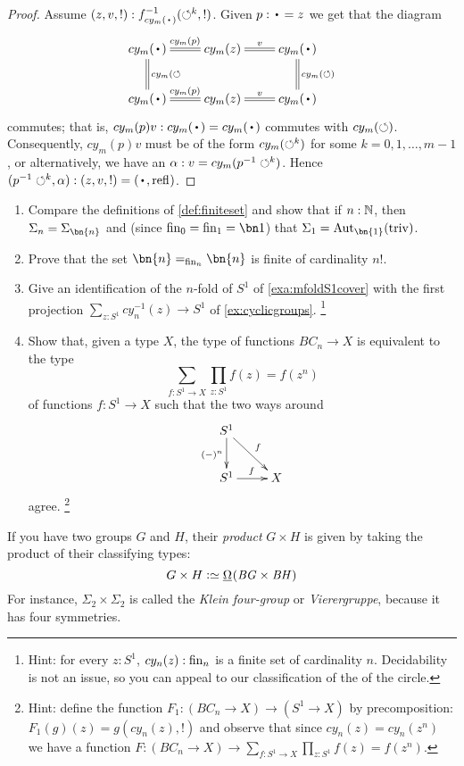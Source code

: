 \begin{example}
\begin{proof}
  Assume $(z,v,!):f_{cy_m(\base)}^{-1}(\Sloop^k,!)$.  Given $p:\base=z$ we get that the diagram
  $$\xymatrix{cy_m(\base)\ar@{=}[r]^{cy_m(p)}\ar@{=}[d]^{cy_m(\Sloop}&cy_m(z)\ar@{=}[r]^-v&cy_m(\base)\ar@{=}[d]^{cy_m(\Sloop)}\\
  cy_m(\base)\ar@{=}[r]^{cy_m(p)}&cy_m(z)\ar@{=}[r]^-v&cy_m(\base)}$$
commutes; that is, $cy_m(p)v:cy_m(\base)=cy_m(\base)$ commutes with $cy_m(\circlearrowleft)$.
Consequently, $cy_m(p)v$ must be of the form $cy_m(\circlearrowleft^k)$ for some $k=0,1,\dots,m-1$, or alternatively, we have an $\alpha:v=cy_m(p^{-1}\circlearrowleft^k)$.
Hence $(p^{-1}\Sloop^k,\alpha):(z,v,!)=(\base,\refl{})$.
\end{proof}

\end{example}
\begin{xca}
  \label{xca:somedetailsonfinitegroupstocheck}
  \begin{enumerate}
  \item Compare the definitions of \cref{def:finiteset} and show that if $n:\mathbb{N}$, then $\Sigma_n=\Sigma_{\bn{n} }$
and (since $\fin_0=\fin_1=\bn 1$) that $\Sigma_{1}=\aut_{\bn{1} }(\triv)$.
\item Prove that the set $\bn{n} =_{\fin_n}\bn{n} $ is finite of cardinality $n!$.
\item Give an identification of the $n$-fold \covering of $S^1$ of \cref{exa:mfoldS1cover} with the first projection $\sum_{z:S^1}cy_n^{-1}(z)\to S^1$ of \cref{ex:cyclicgroups}.
\footnote{Hint: for every $z:S^1$, $cy_n(z):\fin_n$ is a finite set of cardinality $n$.
Decidability is not an issue, so you can appeal to our classification of the \coverings of the circle.}
\item Show that, given a type $X$, the type of functions $BC_n\to X$ is equivalent to the type
$$\sum_{f:S^1\to X}\prod_{z:S^1}f(z)=f(z^n)$$ of functions $f:S^1\to X$ such that the two ways around
$$\xymatrix{S^1\ar[d]_{(-)^n}\ar[dr]^f&\\S^1\ar[r]^f&X}$$
agree. \footnote{Hint: define the function $F_1:(BC_n\to X)\to (S^1\to X)$ by precomposition:
$F_1(g)(z)=g(cy_n(z),!)$ and observe that since $cy_n(z)=cy_n(z^n)$ we have a
function $F:(BC_n\to X)\to \sum_{f:S^1\to X}\prod_{z:S^1}f(z)=f(z^n)$.}
\end{enumerate}
\end{xca}


\begin{example}\label{ex:productofgroups}
  If you have two groups $G$ and $H$, their \emph{product} $G\times H$ is given by taking the product of their classifying types:
  \[
    G\times H\defequi \mkgroup(\BG\times\BH)
  \]
  For instance, $\Sigma_2\times\Sigma_2$ is called the
  \emph{Klein four-group} or \emph{Vierergruppe}, because
    it has four symmetries.
  \end{example}

